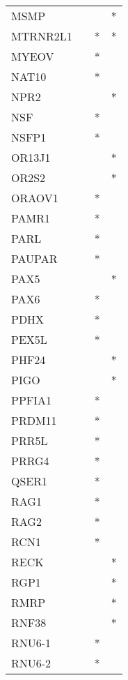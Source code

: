 \begin{longtable}{lccc}
MSMP          &       &    &       * \\
MTRNR2L1      &       &  * &       * \\
MYEOV         &       &  * &         \\
NAT10         &       &  * &         \\
NPR2          &       &    &       * \\
NSF           &       &  * &         \\
NSFP1         &       &  * &         \\
OR13J1        &       &    &       * \\
OR2S2         &       &    &       * \\
ORAOV1        &       &  * &         \\
PAMR1         &       &  * &         \\
PARL          &       &  * &         \\
PAUPAR        &       &  * &         \\
PAX5          &       &    &       * \\
PAX6          &       &  * &         \\
PDHX          &       &  * &         \\
PEX5L         &       &  * &         \\
PHF24         &       &    &       * \\
PIGO          &       &    &       * \\
PPFIA1        &       &  * &         \\
PRDM11        &       &  * &         \\
PRR5L         &       &  * &         \\
PRRG4         &       &  * &         \\
QSER1         &       &  * &         \\
RAG1          &       &  * &         \\
RAG2          &       &  * &         \\
RCN1          &       &  * &         \\
RECK          &       &    &       * \\
RGP1          &       &    &       * \\
RMRP          &       &    &       * \\
RNF38         &       &    &       * \\
RNU6-1        &       &  * &         \\
RNU6-2        &       &  * &         \\

\end{longtable}

